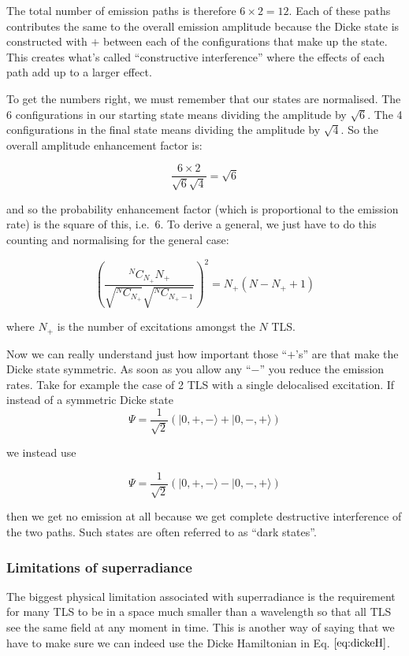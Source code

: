 \documentclass[
]{article}
\renewcommand{\[}{\begin{equation}}
\renewcommand{\]}{\end{equation}}
\begin{document}
The total number of emission paths is therefore \(6\times 2 = 12\). Each
of these paths contributes the same to the overall emission amplitude
because the Dicke state is constructed with \(+\) between each of the
configurations that make up the state. This creates what's called
``constructive interference'' where the effects of each path add up to a
larger effect.

To get the numbers right, we must remember that our states are
normalised. The 6 configurations in our starting state means dividing
the amplitude by \(\sqrt{6}\). The 4 configurations in the final state
means dividing the amplitude by \(\sqrt{4}\). So the overall amplitude
enhancement factor is:

\[
\frac{6\times 2}{\sqrt{6}\sqrt{4}} = \sqrt{6}
\]

and so the probability enhancement factor (which is proportional to the
emission rate) is the square of this, i.e.~6. To derive a general, we
just have to do this counting and normalising for the general case:

\[
\left(\frac{^N C_{N_+} N_+}{\sqrt{^N C_{N_+}}\sqrt{^N C_{{N_+}-1}}}\right)^2 = N_+\left(N-N_++1\right)
\]

where \(N_+\) is the number of excitations amongst the \(N\) TLS.

Now we can really understand just how important those ``\(+\)'s'' are
that make the Dicke state symmetric. As soon as you allow any ``\(-\)''
you reduce the emission rates. Take for example the case of 2 TLS with a
single delocalised excitation. If instead of a symmetric Dicke state \[
\Psi = \frac{1}{\sqrt{2}}\left(| 0, +, -\rangle + | 0, -, + \rangle \right)
\]

we instead use

\[
\Psi = \frac{1}{\sqrt{2}}\left(| 0, +, -\rangle - | 0, -, + \rangle \right)
\]

then we get no emission at all because we get complete destructive
interference of the two paths. Such states are often referred to as
``dark states''.

\subsubsection{Limitations of
superradiance}\label{limitations-of-superradiance}

The biggest physical limitation associated with superradiance is the
requirement for many TLS to be in a space much smaller than a wavelength
so that all TLS see the same field at any moment in time. This is
another way of saying that we have to make sure we can indeed use the
Dicke Hamiltonian in Eq. \(\ref{eq:dickeH}\).
\end{document}

